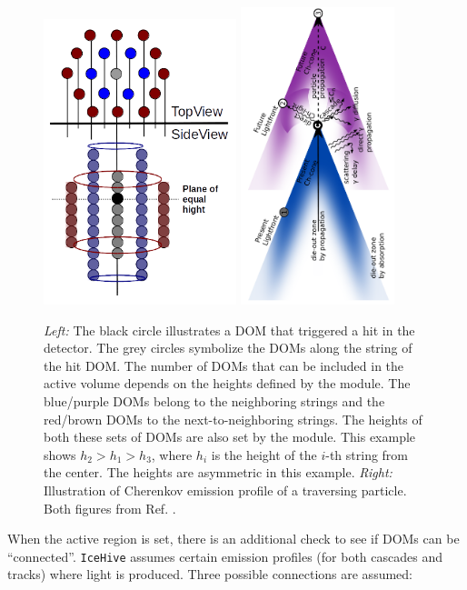 \begin{figure}[t]
\centering
\includegraphics[width=0.5\textwidth]{chapter7/img/hexagons.png}
\includegraphics[width=0.4\textwidth]{chapter7/img/cherenkovzoll.png}
\caption{\textit{Left: }The black circle illustrates a DOM that triggered a hit in the detector. The grey circles symbolize the DOMs along the string of the hit DOM. The number of DOMs that can be included in the active volume depends on the heights defined by the module. The blue/purple DOMs belong to the neighboring strings and the red/brown DOMs to the next-to-neighboring strings. The heights of both these sets of DOMs are also set by the module. This example shows $h_2 > h_1 > h_3$, where $h_i$ is the height of the $i$-th string from the center. The heights are asymmetric in this example. \textit{Right: }Illustration of Cherenkov emission profile of a traversing particle. Both figures from Ref. \cite{mzollthesis}.}
\label{fig:hexagon}
\end{figure}
When the active region is set, there is an additional check to see if DOMs can be ``connected''. \texttt{IceHive} assumes certain emission profiles (for both cascades and tracks) where light is produced. Three possible connections are assumed:

